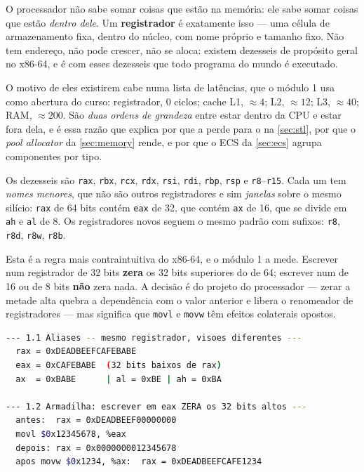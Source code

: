 \begin{porque}
O processador não sabe somar coisas que estão na memória: ele sabe somar coisas
que estão \emph{dentro dele}. Um \textbf{registrador} é exatamente isso --- uma
célula de armazenamento fixa, dentro do núcleo, com nome próprio e tamanho
fixo. Não tem endereço, não pode crescer, não se aloca: existem dezesseis de
propósito geral no x86-64, e é com esses dezesseis que todo programa do mundo é
executado.

O motivo de eles existirem cabe numa lista de latências, que o módulo 1 usa
como abertura do curso: registrador, 0 ciclos; cache L1, $\approx 4$; L2,
$\approx 12$; L3, $\approx 40$; RAM, $\approx 200$. São \emph{duas ordens de
grandeza} entre estar dentro da CPU e estar fora dela, e é essa razão que
explica por que a  perde para o  na
\cref{sec:stl}, por que o \emph{pool allocator} da \cref{sec:memory} rende, e
por que o ECS da \cref{sec:ecs} agrupa componentes por tipo.
\end{porque}

Os dezesseis são \texttt{rax}, \texttt{rbx}, \texttt{rcx}, \texttt{rdx},
\texttt{rsi}, \texttt{rdi}, \texttt{rbp}, \texttt{rsp} e
\texttt{r8}--\texttt{r15}. Cada um tem \emph{nomes menores}, que não são outros
registradores e sim \emph{janelas} sobre o mesmo silício:
\texttt{rax} de 64 bits contém \texttt{eax} de 32, que contém \texttt{ax} de
16, que se divide em \texttt{ah} e \texttt{al} de 8. Os registradores novos
seguem o mesmo padrão com sufixos: \texttt{r8}, \texttt{r8d}, \texttt{r8w},
\texttt{r8b}.

\begin{armadilha}
Esta é a regra mais contraintuitiva do x86-64, e o módulo 1 a mede. Escrever
num registrador de 32 bits \textbf{zera} os 32 bits superiores do de 64;
escrever num de 16 ou de 8 bits \textbf{não} zera nada. A decisão é do projeto
do processador --- zerar a metade alta quebra a dependência com o valor
anterior e libera o renomeador de registradores --- mas significa que
\texttt{movl} e \texttt{movw} têm efeitos colaterais opostos.
\end{armadilha}

\begin{lstlisting}[style=bt, language=bash,
    caption={Saída medida de \texttt{dist/bin/asm\_01\_registers}
             (cores removidas).}]
--- 1.1 Aliases -- mesmo registrador, visoes diferentes ---
  rax = 0xDEADBEEFCAFEBABE
  eax = 0xCAFEBABE  (32 bits baixos de rax)
  ax  = 0xBABE      | al = 0xBE | ah = 0xBA

--- 1.2 Armadilha: escrever em eax ZERA os 32 bits altos ---
  antes:  rax = 0xDEADBEEF00000000
  movl $0x12345678, %eax
  depois: rax = 0x0000000012345678
  apos movw $0x1234, %ax:  rax = 0xDEADBEEFCAFE1234
\end{lstlisting}

